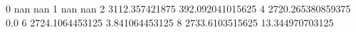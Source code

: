0 nan nan
1 nan nan
2 3112.357421875 392.092041015625
4 2720.265380859375 0.0
6 2724.1064453125 3.841064453125
8 2733.6103515625 13.344970703125
